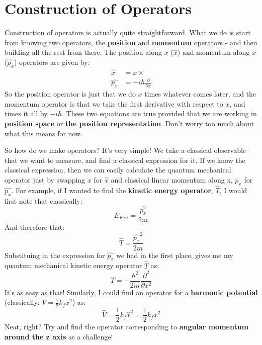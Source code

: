 \documentclass{memoir}[11pt,oneside,a4paper,openany]
\begin{document}
\chapter{Construction of Operators}\label{app:operator_construction}
Construction of operators is actually quite straightforward. What we do is start from knowing two operators, the \textbf{position} and \textbf{momentum} operators - and then building all the rest from there. The position along $x$ ($\hat{x}$) and momentum along $x$ ($\hat{p_x}$) operators are given by:
\begin{align}
	\hat{x} &= x\times\\
	\hat{p_x} &= -i\hbar \frac{\partial}{\partial x}
\end{align}
So the position operator is just that we do $x$ times whatever comes later, and the momentum operator is that we take the first derivative with respect to $x$, and times it all by $-i\hbar$. These two equations are true provided that we are working in \textbf{position space} or \textbf{the position representation}. Don't worry too much about what this means for now. 

So how do we make operators? It's very simple! We take a classical observable that we want to measure, and find a classical expression for it. If we know the classical expression, then we can easily calculate the quantum mechanical operator just by swapping $x$ for $\hat{x}$ and classical linear momentum along x, $p_x$ for $\hat{p_x}$. For example, if I wanted to find the \textbf{kinetic energy operator}, $\hat{T}$, I would first note that classically:
\begin{equation}
	E_{Kin} = \frac{p_x^2}{2m}
\end{equation}
And therefore that:
\begin{equation}
	\hat{T} = \frac{\hat{p_x}^2}{2m}
\end{equation}
Substituing in the expression for $\hat{p_x}$ we had in the first place, gives me my quantum mechanical kinetic energy operator $\hat{T}$ as:
\begin{equation}
	\hat{T} = -\frac{\hbar^2}{2m}\frac{\partial^2}{\partial x^2}
\end{equation}
It's as easy as that! Similarly, I could find an operator for a \textbf{harmonic potential} (classically: $V = \frac{1}{2}k_fx^2$) as:
\begin{equation}
	\hat{V} = \frac{1}{2}k_f\hat{x}^2 = \frac{1}{2}k_fx^2
\end{equation}
Neat, right? Try and find the operator corresponding to \textbf{angular momentum around the z axis} as a challenge!
\end{document}
